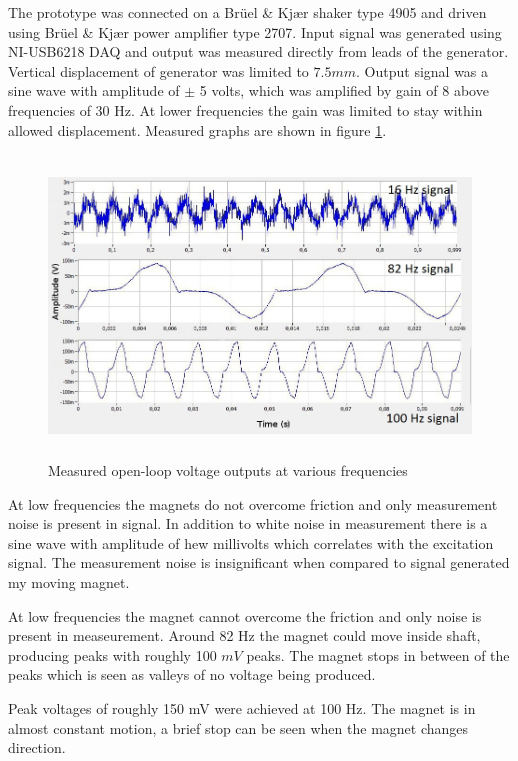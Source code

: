 The prototype was connected on a  Brüel \& Kjær shaker type 4905 and driven using  Brüel \& Kjær power amplifier type 2707. Input signal was generated using NI-USB6218 DAQ and output was measured directly from leads of the generator. Vertical displacement of generator was limited to $7.5 mm$. Output signal was a sine wave with amplitude of $\pm$ 5 volts, which was amplified by gain of 8 above frequencies of 30 Hz. At lower frequencies the gain was limited to stay within allowed displacement. Measured graphs are shown in figure \ref{fiq:lg_proto_results}.

\begin{figure}[h]
\begin{center}
  \includegraphics[height=8cm]{images/own_measurement/lg_proto.jpg}
  \end{center}
  \caption{\label{fiq:lg_proto_results} Measured open-loop voltage outputs at various frequencies}
\end{figure}

At low frequencies the magnets do not overcome friction and only measurement noise is present in signal. In addition to white noise in measurement there is a sine wave with amplitude of hew millivolts which correlates with the excitation signal. The measurement noise is insignificant when compared to signal generated my moving magnet. 

At low frequencies the magnet cannot overcome the friction and only noise is present in measeurement. Around 82 Hz the magnet could move inside shaft, producing peaks with roughly 100 $mV$ peaks. The magnet stops in between of the peaks which is seen as valleys of no voltage being produced. 

Peak voltages of roughly 150 mV were achieved at 100 Hz. The magnet is in almost constant motion, a brief stop can be seen when the magnet changes direction. 

